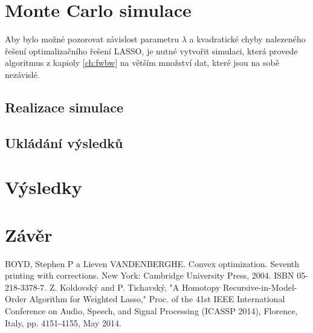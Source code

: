 \documentclass[FM,BP]{tulthesis}
\begin{document}
\chapter{Monte Carlo simulace}
\label{ch:simulace}
Aby bylo možné pozorovat závislost parametru $\lambda$ a kvadratické chyby nalezeného řešení optimalizačního řešení LASSO, je nutné vytvořit simulaci, která provede algoritmus z kapioly \ref{ch:fwbw} na větším množství dat, které jsou na sobě nezávislé.
\section{Realizace simulace}
\section{Ukládání výsledků}
\chapter{Výsledky}
\label{ch:vysledky}

\chapter{Závěr}
\label{ch:end}

\renewcommand{\bibname}{Seznam použité literatury}
\begin{thebibliography}{99}
 BOYD, Stephen P a Lieven VANDENBERGHE. Convex optimization. Seventh printing with corrections. New York: Cambridge University Press, 2004. ISBN 05-218-3378-7.
Z. Koldovský and P. Tichavský, "A Homotopy Recursive-in-Model-Order Algorithm for Weighted Lasso," Proc. of the 41st IEEE International Conference on Audio, Speech, and Signal Processing (ICASSP 2014), Florence, Italy, pp. 4151-4155, May 2014.
\end{thebibliography}
\end{document}
